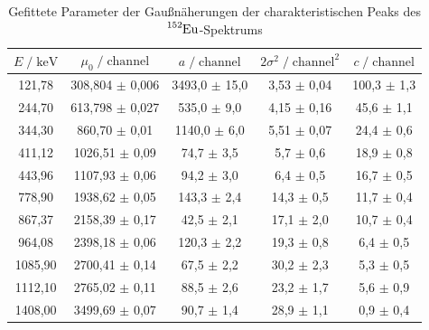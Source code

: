 \begin{table}
  \centering
  \caption{Gefittete Parameter der Gaußnäherungen der charakteristischen Peaks des $\ce{^{152}Eu}$-Spektrums}
  \label{tab:mess1}
  \begin{tabular}{c c c c c}
  \toprule
  $ E \;/\; \si{\kilo\eV}$ & $\mu_0 \;/\; \text{channel}$ & $a \;/\; \text{channel}$ & $2\sigma^2 \;/\; \text{channel}^2$ & $c \;/\; \text{channel}$ \\
  \midrule
        121,78 &  308,804 $\pm$ 0,006 & 3493,0 $\pm$ 15,0 &  3,53 $\pm$ 0,04 & 100,3 $\pm$ 1,3 \\
        244,70 &  613,798 $\pm$ 0,027 &  535,0 $\pm$  9,0 &  4,15 $\pm$ 0,16 &  45,6 $\pm$ 1,1 \\
        344,30 &  860,70  $\pm$ 0,01  & 1140,0 $\pm$  6,0 &  5,51 $\pm$ 0,07 &  24,4 $\pm$ 0,6 \\
        411,12 & 1026,51  $\pm$ 0,09  &   74,7 $\pm$  3,5 &  5,7  $\pm$ 0,6  &  18,9 $\pm$ 0,8 \\
        443,96 & 1107,93  $\pm$ 0,06  &   94,2 $\pm$  3,0 &  6,4  $\pm$ 0,5  &  16,7 $\pm$ 0,5 \\
        778,90 & 1938,62  $\pm$ 0,05  &  143,3 $\pm$  2,4 & 14,3  $\pm$ 0,5  &  11,7 $\pm$ 0,4 \\
        867,37 & 2158,39  $\pm$ 0,17  &   42,5 $\pm$  2,1 & 17,1  $\pm$ 2,0  &  10,7 $\pm$ 0,4 \\
        964,08 & 2398,18  $\pm$ 0,06  &  120,3 $\pm$  2,2 & 19,3  $\pm$ 0,8  &   6,4 $\pm$ 0,5 \\
       1085,90 & 2700,41  $\pm$ 0,14  &   67,5 $\pm$  2,2 & 30,2  $\pm$ 2,3  &   5,3 $\pm$ 0,5 \\
       1112,10 & 2765,02  $\pm$ 0,11  &   88,5 $\pm$  2,6 & 23,2  $\pm$ 1,7  &   5,6 $\pm$ 0,9 \\
       1408,00 & 3499,69  $\pm$ 0,07  &   90,7 $\pm$  1,4 & 28,9  $\pm$ 1,1  &   0,9 $\pm$ 0,4 \\
  \bottomrule
  \end{tabular}
  \end{table}

